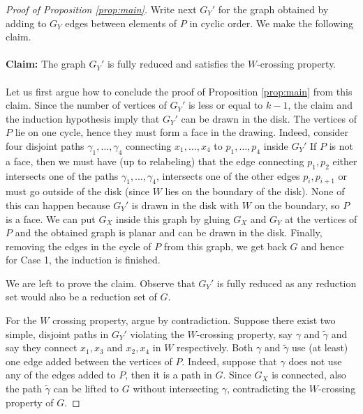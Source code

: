 \documentclass[10pt,a4paper]{amsart}
\begin{document}
\begin{proof}[Proof of Proposition \ref{prop:main}]
    Write next $G_Y'$ for the graph obtained by adding to $G_Y$ edges between elements of $P$ in cyclic order. 
    We make the following claim. 
    \\
    \\
    \noindent \textbf{Claim:}
    The graph $G_Y'$ is fully reduced and satisfies the $W$-crossing property. 
    \\
    \\
    \noindent Let us first argue how to conclude the proof of Proposition \ref{prop:main} from this claim. 
    Since the number of vertices of $G_Y'$ is less or equal to $k -1$, 
    the claim and the induction hypothesis imply that $G_Y'$ can be drawn in the disk. 
    The vertices of $P$ lie on one cycle, hence they must form a face in the drawing. 
    Indeed, consider four disjoint paths ${\gamma}_1, \ldots, {\gamma}_4$ connecting 
    $x_1, \ldots, x_4$ to $p_1, \ldots, p_4$ inside $G_Y'$ 
    If $P$ is not a face, then we must have (up to relabeling) 
    that the edge connecting $p_1, p_2$ either intersects one of the paths ${\gamma}_1, \ldots, {\gamma}_4$, 
    intersects one of the other edges $p_i, p_{i+1}$ or must go outside of the disk 
    (since $W$ lies on the boundary of the disk). 
    None of this can happen because $G_Y'$ is drawn in the disk with $W$ on the boundary, so $P$ is a face. 
    We can put $G_X$ inside this graph by gluing $G_X$ and $G_Y$ at the vertices of $P$ 
    and the obtained graph is planar and can be drawn in the disk. 
    Finally, removing the edges in the cycle of $P$ from this graph, we get back $G$ and hence for Case 1, 
	the induction is finished.
    
    We are left to prove the claim. 
	Observe that $G_Y'$ is fully reduced as any reduction set would also be a reduction set of $G$. 
    
    For the $W$ crossing property, argue by contradiction. 
	Suppose there exist two simple, disjoint paths in $G_Y'$ violating the $W$-crossing property, 
	say $\gamma$ and $\widetilde{\gamma}$ and say they connect $x_1, x_3$ and $x_2, x_4$ in $W$ respectively. 
	Both $\gamma$ and $\widetilde{\gamma}$ use (at least) one edge added between the vertices of $P$. 
	Indeed, suppose that $\gamma$ does not use any of the edges added to $P$, 
	then it is a path in $G$. 
	Since $G_X$ is connected, also the path $\widetilde{\gamma}$ can be lifted to $G$ without intersecting $\gamma$, 
	contradicting the $W$-crossing property of $G$. 


\end{proof}
\end{document}
